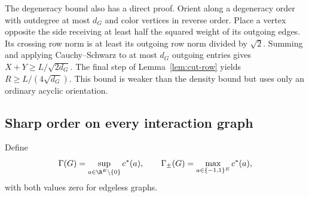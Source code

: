 The degeneracy bound also has a direct proof. Orient along a degeneracy
order with outdegree at most $d_G$ and color vertices in reverse order.
Place a vertex opposite the side receiving at least half the squared weight
of its outgoing edges. Its crossing row norm is at least its outgoing row
norm divided by $\sqrt2$. Summing and applying Cauchy--Schwarz to at most
$d_G$ outgoing entries gives $X+Y\ge L/\sqrt{2d_G}$. The final step of
Lemma~\ref{lem:cut-row} yields $R\ge L/(4\sqrt{d_G})$. This bound is weaker
than the density bound but uses only an ordinary
acyclic orientation.

\subsection{Sharp order on every interaction graph}
Define
\[
 \Gamma(G)=\sup_{a\in\R^E\setminus\{0\}}c^*(a),\qquad
 \Gamma_\pm(G)=\max_{a\in\{-1,1\}^E}c^*(a),
\]
with both values zero for edgeless graphs.

